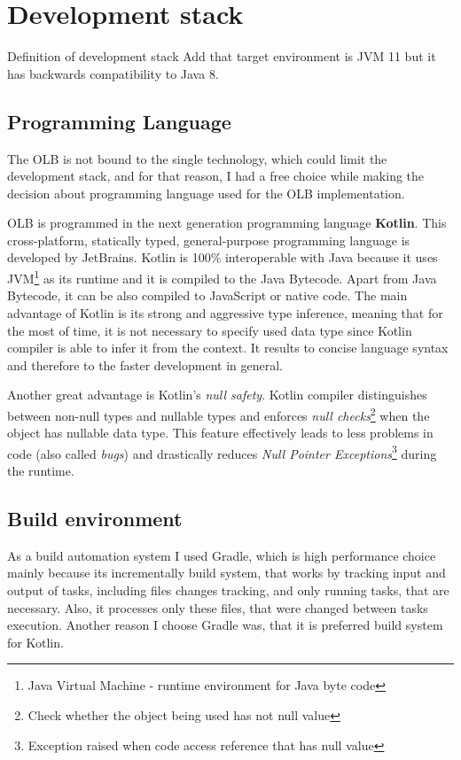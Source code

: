 \section{Development stack}\label{sec:development-stack}
Definition of development stack
Add that target environment is JVM 11 but it has backwards compatibility to Java 8.

\subsection{Programming Language}\label{subsec:programming-language}
The OLB is not bound to the single technology, which could limit the development stack,  
and for that reason,
I had a free choice while making the decision about programming language used for the OLB implementation.

OLB is programmed in the next generation programming language \textbf{Kotlin}.
This cross-platform, statically typed, general-purpose programming language is developed by JetBrains.
Kotlin is 100\% interoperable with Java because it uses JVM\footnote{Java Virtual Machine - runtime environment for Java byte code} 
as its runtime and it is compiled to the Java Bytecode.
Apart from Java Bytecode, it can be also compiled to JavaScript or native code.
The main advantage of Kotlin is its strong and aggressive type inference,
meaning that for the most of time,
it is not necessary to specify used data type since Kotlin compiler is able to infer it from the context.
It results to concise language syntax and therefore to the faster development in general.

Another great advantage is Kotlin's \textit{null safety}. 
Kotlin compiler distinguishes between non-null types and nullable types 
and enforces \textit{null checks}\footnote{Check whether the object being used has not null value} when the object has nullable data type.
This feature effectively leads to less problems in code (also called \textit{bugs})
and drastically reduces \textit{Null Pointer Exceptions}\footnote{Exception raised when code access reference that has null value}
during the runtime.


\subsection{Build environment}
As a build automation system I used Gradle, 
which is high performance choice mainly because its incrementally build system,
that works by tracking input and output of tasks, 
including files changes tracking, and only running tasks, that are necessary. 
Also, it processes only these files, that were changed between tasks execution. 
Another reason I choose Gradle was, that it is preferred build system for Kotlin.

